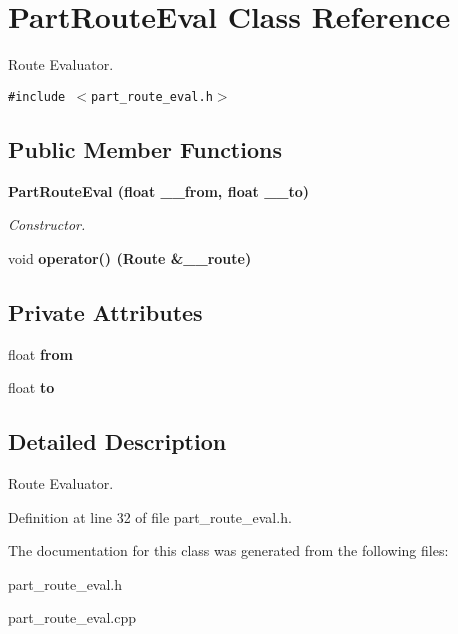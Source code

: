 \section{Part\-Route\-Eval Class Reference}
\label{class_part_route_eval}
Route Evaluator.  


{\tt \#include $<$part\_\-route\_\-eval.h$>$}

\subsection*{Public Member Functions}
\begin{CompactItemize}
\item 
\bf{Part\-Route\-Eval} (float \_\-\_\-from, float \_\-\_\-to)\label{class_part_route_eval_a331566b29bc3227f377004232f05491}

\begin{CompactList}\small\item\em Constructor. \item\end{CompactList}\item 
void \bf{operator()} (Route \&\_\-\_\-route)\label{class_part_route_eval_965fab875fb601f17934a6ece761beae}

\end{CompactItemize}
\subsection*{Private Attributes}
\begin{CompactItemize}
\item 
float \bf{from}\label{class_part_route_eval_5bde722e66378b2570ae6c4b4f8df58e}

\item 
float \bf{to}\label{class_part_route_eval_de53cc919faa498663f327b72c357da3}

\end{CompactItemize}


\subsection{Detailed Description}
Route Evaluator. 



Definition at line 32 of file part\_\-route\_\-eval.h.

The documentation for this class was generated from the following files:\begin{CompactItemize}
\item 
part\_\-route\_\-eval.h\item 
part\_\-route\_\-eval.cpp\end{CompactItemize}

